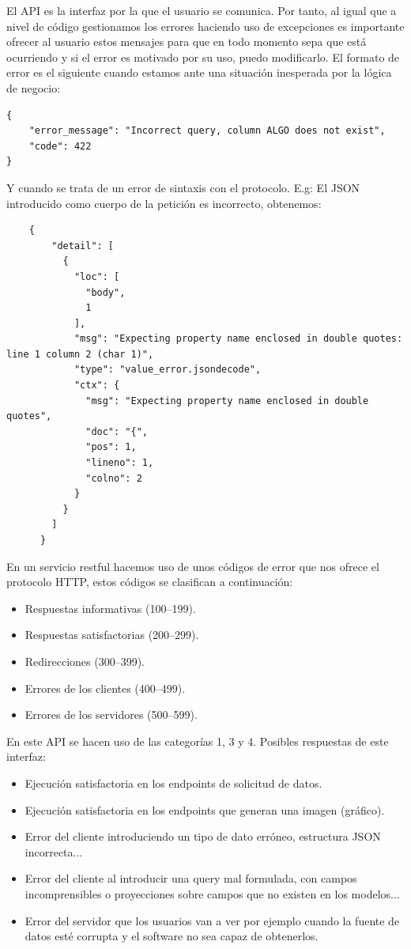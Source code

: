 El API es la interfaz por la que el usuario se comunica. Por tanto, al igual que a nivel de código gestionamos los errores haciendo uso de excepciones es importante ofrecer al usuario estos mensajes para que en todo momento sepa que está ocurriendo y si el error es motivado por su uso, puedo modificarlo. El formato de error es el siguiente cuando estamos ante una situación inesperada por la lógica de negocio:
\begin{verbatim}
{
    "error_message": "Incorrect query, column ALGO does not exist",
    "code": 422
}
\end{verbatim}
Y cuando se trata de un error de sintaxis con el protocolo. E.g: El JSON introducido como cuerpo de la petición es incorrecto, obtenemos:
\begin{verbatim}
    {
        "detail": [
          {
            "loc": [
              "body",
              1
            ],
            "msg": "Expecting property name enclosed in double quotes: line 1 column 2 (char 1)",
            "type": "value_error.jsondecode",
            "ctx": {
              "msg": "Expecting property name enclosed in double quotes",
              "doc": "{",
              "pos": 1,
              "lineno": 1,
              "colno": 2
            }
          }
        ]
      }
\end{verbatim}

En un servicio restful hacemos uso de unos códigos de error que nos ofrece el protocolo HTTP, estos códigos se clasifican a continuación:
\begin{itemize}
    \item Respuestas informativas (100–199).
    \item Respuestas satisfactorias (200–299).
    \item Redirecciones (300–399).
    \item Errores de los clientes (400–499).
    \item Errores de los servidores (500–599).
\end{itemize}

En este API se hacen uso de las categorías 1, 3 y 4. Posibles respuestas de este interfaz:
\begin{itemize}
    \item {} Ejecución satisfactoria en los endpoints de solicitud de datos.
    \item {} Ejecución satisfactoria en los endpoints que generan una imagen (gráfico).
    \item {} Error del cliente introduciendo un tipo de dato erróneo, estructura JSON incorrecta...
    \item {} Error del cliente al introducir una query mal formulada, con campos incomprensibles o proyecciones sobre campos que no existen en los modelos...
    \item {} Error del servidor que los usuarios van a ver por ejemplo cuando la fuente de datos esté corrupta y el software no sea capaz de obtenerlos.
\end{itemize}

